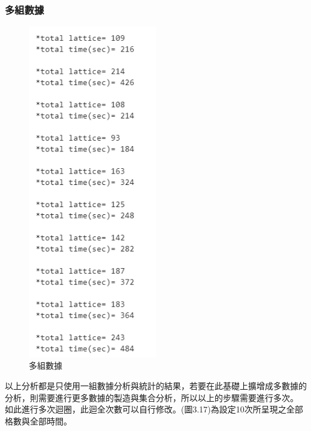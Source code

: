 \subsubsection{多組數據}
	\begin{figure}[H] 
	\centering 
	\includegraphics[width=0.5\textwidth]{3_17.png} 
	\caption{多組數據} 
	\label{Fig.3.17} 
\end{figure}
以上分析都是只使用一組數據分析與統計的結果，若要在此基礎上擴增成多數據的分析，則需要進行更多數據的製造與集合分析，所以以上的步驟需要進行多次。
如此進行多次迴圈，此迴全次數可以自行修改。(圖3.17)為設定10次所呈現之全部格數與全部時間。
